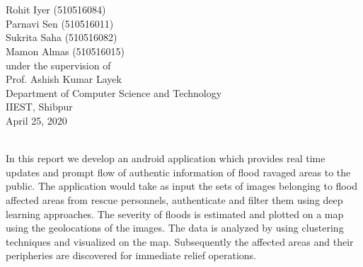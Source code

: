 \documentclass[12pt]{article}
\begin{document}
	\begin{center}
	\scalebox{2}{\fontsize{32pt}{10pt}\selectfont {Flood alert application}}\\ 
	\scalebox{2}{\fontsize{32pt}{10pt}\selectfont {using android}}
	\\[2in]
		\begin{LARGE}
		Rohit Iyer (510516084)\\
		Parnavi Sen (510516011)\\
		Sukrita Saha (510516082)\\
		Mamon Almas (510516015)\\		
		under the supervision of\\[1cm]
		Prof. Ashish Kumar Layek\\[1in]
		Department of Computer Science and Technology\\
		IIEST, Shibpur\\
		April 25, 2020\\
		\end{LARGE}
	\newpage
	\end{center}
	
	\begin{center}
	\\[1in]
In this report we develop an android application which provides real time updates and prompt flow of authentic information of flood ravaged areas to the public. The application would take as input the sets of images belonging to flood affected areas from rescue personnels, authenticate and filter them using deep learning approaches. The severity of floods is estimated and plotted on a map using the geolocations of the images. The data is analyzed by using clustering techniques and visualized on the map. Subsequently the affected areas and their peripheries are discovered for immediate relief operations.
	\end{center}\newpage
\tableofcontents
\newpage
\listoffigures
\newpage
\end{document}
